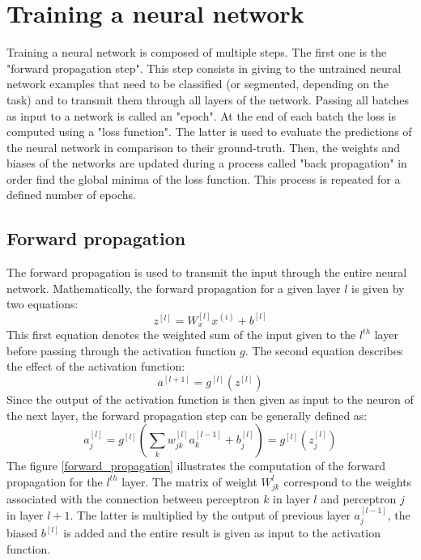 \section{Training a neural network}
\label{training_a_neural_network}
Training a neural network is composed of multiple steps. The first one is the "forward propagation step". This step consists in giving to the untrained neural network examples that need to be classified (or segmented, depending on the task) and to transmit them through all layers of the network. Passing all batches as input to a network is called an "epoch". At the end of each batch the loss is computed using a "loss function". The latter is used to evaluate the predictions of the neural network in comparison to their ground-truth. Then, the weights and biases of the networks are updated during a process called "back propagation" in order find the global minima of the loss function. This process is repeated for a defined number of epochs.



\subsection{Forward propagation}
The forward propagation is used to transmit the input through the entire neural network. Mathematically, the forward propagation for a given layer $l$ is given by two equations:
\begin{equation}
z^{[l]} = W_{x}^{[l]}x^{(i)} + b^{[l]}
\end{equation}
This first equation denotes the weighted sum of the input given to the $l^{th}$ layer before passing through the activation function $g$. The second equation describes the effect of the activation function:
\begin{equation}
a^{[l+1]} = g^{[l]}(z^{[l]})
\end{equation}
Since the output of the activation function is then given as input to the neuron of the next layer, the forward propagation step can be generally defined as:
\begin{equation}
a_{j}^{[l]} = g^{[l]} (\sum_{k} w_{jk}^{[l]}a_{k}^{[l-1]} + b_{j}^{[l]}) = g^{[l]} (z_{j}^{[l]}) 
\end{equation}
The figure \ref{forward_propagation} illustrates the computation of the forward propagation for the $l^{th}$ layer. The matrix of weight $W_{jk}^{l}$ correspond to the weights associated with the connection between perceptron $k$ in layer $l$ and perceptron $j$ in layer $l+1$. The latter is multiplied by the output of previous layer $a_{j}^{[l-1]}$, the biased $b^{[l]}$ is added and the entire result is given as input to the activation function.

